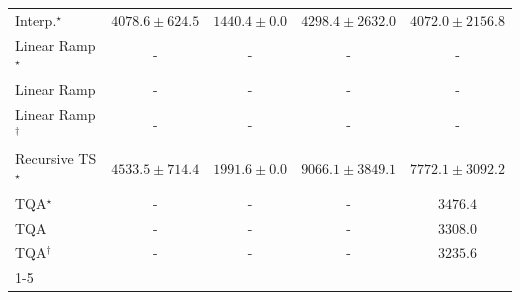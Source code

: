 \begin{tabular}{l|cccc|}
Interp.$^\star$ & {\cellcolor[HTML]{B4C4DF}} \color[HTML]{000000} $4078.6\pm 624.5$ & {\cellcolor[HTML]{FFF7FB}} \color[HTML]{000000} $1440.4\pm 0.0$ & {\cellcolor[HTML]{A9BFDC}} \color[HTML]{000000} $4298.4\pm 2632.0$ & {\cellcolor[HTML]{B4C4DF}} \color[HTML]{000000} $4072.0\pm 2156.8$ \\
Linear Ramp$^\star$ & {\cellcolor[HTML]{000000}} \color[HTML]{F1F1F1} {\cellcolor{white}} \color{black} - & {\cellcolor[HTML]{000000}} \color[HTML]{F1F1F1} {\cellcolor{white}} \color{black} - & {\cellcolor[HTML]{000000}} \color[HTML]{F1F1F1} {\cellcolor{white}} \color{black} - & {\cellcolor[HTML]{000000}} \color[HTML]{F1F1F1} {\cellcolor{white}} \color{black} - \\
Linear Ramp & {\cellcolor[HTML]{000000}} \color[HTML]{F1F1F1} {\cellcolor{white}} \color{black} - & {\cellcolor[HTML]{000000}} \color[HTML]{F1F1F1} {\cellcolor{white}} \color{black} - & {\cellcolor[HTML]{000000}} \color[HTML]{F1F1F1} {\cellcolor{white}} \color{black} - & {\cellcolor[HTML]{000000}} \color[HTML]{F1F1F1} {\cellcolor{white}} \color{black} - \\
Linear Ramp$^\dagger$ & {\cellcolor[HTML]{000000}} \color[HTML]{F1F1F1} {\cellcolor{white}} \color{black} - & {\cellcolor[HTML]{000000}} \color[HTML]{F1F1F1} {\cellcolor{white}} \color{black} - & {\cellcolor[HTML]{000000}} \color[HTML]{F1F1F1} {\cellcolor{white}} \color{black} - & {\cellcolor[HTML]{000000}} \color[HTML]{F1F1F1} {\cellcolor{white}} \color{black} - \\
Recursive TS$^\star$ & {\cellcolor[HTML]{9FBAD9}} \color[HTML]{000000} $4533.5\pm 714.4$ & {\cellcolor[HTML]{F5EEF6}} \color[HTML]{000000} $1991.6\pm 0.0$ & {\cellcolor[HTML]{023F64}} \color[HTML]{F1F1F1} $9066.1\pm 3849.1$ & {\cellcolor[HTML]{0566A0}} \color[HTML]{F1F1F1} $7772.1\pm 3092.2$ \\
TQA$^\star$ & {\cellcolor[HTML]{000000}} \color[HTML]{F1F1F1} {\cellcolor{white}} \color{black} - & {\cellcolor[HTML]{000000}} \color[HTML]{F1F1F1} {\cellcolor{white}} \color{black} - & {\cellcolor[HTML]{000000}} \color[HTML]{F1F1F1} {\cellcolor{white}} \color{black} - & {\cellcolor[HTML]{CDD0E5}} \color[HTML]{000000} $3476.4$ \\
TQA & {\cellcolor[HTML]{000000}} \color[HTML]{F1F1F1} {\cellcolor{white}} \color{black} - & {\cellcolor[HTML]{000000}} \color[HTML]{F1F1F1} {\cellcolor{white}} \color{black} - & {\cellcolor[HTML]{000000}} \color[HTML]{F1F1F1} {\cellcolor{white}} \color{black} - & {\cellcolor[HTML]{D3D4E7}} \color[HTML]{000000} $3308.0$ \\
TQA$^\dagger$ & {\cellcolor[HTML]{000000}} \color[HTML]{F1F1F1} {\cellcolor{white}} \color{black} - & {\cellcolor[HTML]{000000}} \color[HTML]{F1F1F1} {\cellcolor{white}} \color{black} - & {\cellcolor[HTML]{000000}} \color[HTML]{F1F1F1} {\cellcolor{white}} \color{black} - & {\cellcolor[HTML]{D5D5E8}} \color[HTML]{000000} $3235.6$ \\
\cline{1-5}
\bottomrule
\end{tabular}
